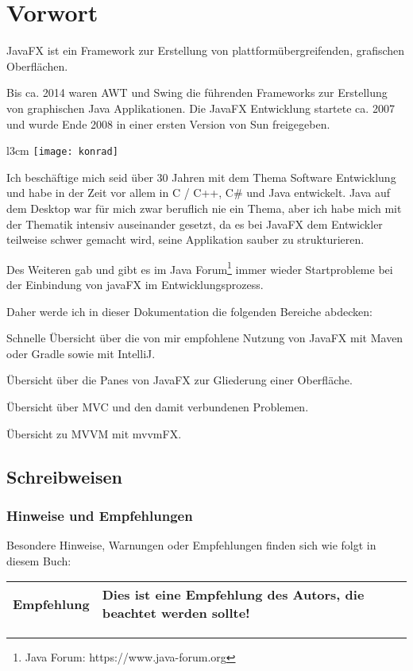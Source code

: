 \section{Vorwort}

JavaFX ist ein Framework zur Erstellung von plattformübergreifenden, grafischen Oberflächen.

Bis ca. 2014 waren AWT und Swing die führenden Frameworks zur Erstellung von graphischen Java Applikationen. Die JavaFX Entwicklung 
startete ca. 2007 und wurde Ende 2008 in einer ersten Version von Sun freigegeben.

\begin{wrapfigure}{l}{3cm}
    \texttt{[image: konrad]}
\end{wrapfigure}

Ich beschäftige mich seid über 30 Jahren mit dem Thema Software Entwicklung und habe in der Zeit vor allem in C / C++, C\# und Java entwickelt.
Java auf dem Desktop war für mich zwar beruflich nie ein Thema, aber ich habe mich mit der Thematik intensiv auseinander gesetzt, da es bei
JavaFX dem Entwickler teilweise schwer gemacht wird, seine Applikation sauber zu strukturieren.

Des Weiteren gab und gibt es im Java Forum\footnote{Java Forum: https://www.java-forum.org} immer wieder Startprobleme bei der Einbindung von javaFX im Entwicklungsprozess.

Daher werde ich in dieser Dokumentation die folgenden Bereiche abdecken:

Schnelle Übersicht über die von mir empfohlene Nutzung von JavaFX mit Maven oder Gradle sowie mit IntelliJ.

Übersicht über die Panes von JavaFX zur Gliederung einer Oberfläche.

Übersicht über MVC und den damit verbundenen Problemen.

Übersicht zu MVVM mit mvvmFX.

\subsection{Schreibweisen}
\subsubsection{Hinweise und Empfehlungen}
Besondere Hinweise, Warnungen oder Empfehlungen finden sich wie folgt in diesem Buch:

\begin{tabular}[h]{|p{2cm}|p{9cm}|}
\hline
\textbf{Empfehlung} & Dies ist eine Empfehlung des Autors, die beachtet werden sollte! \\
\hline
\end{tabular}

